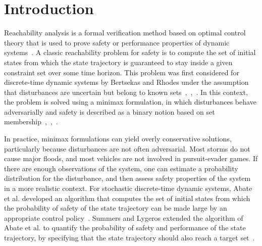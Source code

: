 \documentclass[letterpaper, 10 pt, conference]{ieeeconf}  %
\begin{document}

\section{Introduction}
\label{sec:introduction}
Reachability analysis is a formal verification method based on optimal control theory that is used to prove 
safety or performance properties of dynamic systems~\cite{bansal2017hamilton}.
A classic reachability problem for safety is to compute the set of initial states from which 
the state trajectory is guaranteed to stay inside a given constraint set over some time horizon.
This problem was first considered for discrete-time dynamic systems by Bertsekas and Rhodes 
under the assumption that disturbances are uncertain but belong to known sets~\cite{bertsekas1971control},~\cite{bertsekas1971minimax},~\cite{bertsekas2005dynamic}.
In this context, the problem is solved using a minimax formulation,
in which disturbances behave adversarially and safety is described as a binary notion based on set membership~\cite{bertsekas1971control},~\cite{bertsekas1971minimax},~\cite{bertsekas2005dynamic}.\footnotemark 
{}

In practice, minimax formulations can yield overly conservative solutions, particularly because disturbances are not often adversarial.
Most storms do not cause major floods, and most vehicles are not involved in pursuit-evader games.
If there are enough observations of the system, one can estimate a probability distribution
for the disturbance, and then assess safety properties of the system in a more realistic context.\footnotemark
{} 
For stochastic discrete-time dynamic systems, %
Abate et al. developed an algorithm that computes the set of initial states
from which the probability of safety of the state trajectory can be made large by an appropriate control policy~\cite{abate2008probabilistic}.\footnotemark
{} 
Summers and Lygeros extended the algorithm of Abate et al. to quantify the probability of safety and performance
of the state trajectory, by specifying that the state trajectory should also reach a target set~\cite{summers2010verification}.   
\end{document}
